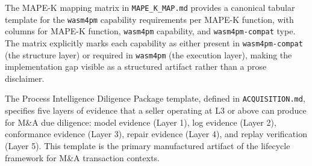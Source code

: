 The MAPE-K mapping matrix in \texttt{MAPE\_K\_MAP.md} provides a canonical tabular
template for the \texttt{wasm4pm} capability requirements per MAPE-K function, with
columns for MAPE-K function, \texttt{wasm4pm} capability, and \texttt{wasm4pm-compat}
type. The matrix explicitly marks each capability as either present in
\texttt{wasm4pm-compat} (the structure layer) or required in \texttt{wasm4pm} (the
execution layer), making the implementation gap visible as a structured artifact rather
than a prose disclaimer.

The Process Intelligence Diligence Package template, defined in \texttt{ACQUISITION.md},
specifies five layers of evidence that a seller operating at L3 or above can produce
for M\&A due diligence: model evidence (Layer 1), log evidence (Layer 2), conformance
evidence (Layer 3), repair evidence (Layer 4), and replay verification (Layer 5). This
template is the primary manufactured artifact of the lifecycle framework for M\&A
transaction contexts.

